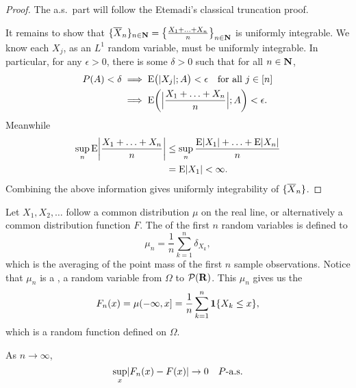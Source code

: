 \begin{proof}
    The a.s.\ part will follow the Etemadi's classical truncation proof.

    It remains to show that $\{\overline{X}_n\}_{n\in \mathbf{N}} = \bigl\{\frac{X_1 + \dotsc + X_n}{n}\bigr\}_{n\in \mathbf{N}}$ is uniformly integrable. We know each $X_j$, as an $L^1$ random variable, must be uniformly integrable. In particular, for any $\epsilon > 0$, there is some $\delta > 0$ such that for all $n\in \mathbf{N}$, \begin{align*}
    P(A) < \delta & \implies \mathop{}\!\mathrm{E} \bigl(\lvert X_j \rvert;A\bigr) < \epsilon \quad\text{for all } j \in [n] \\ & \implies \mathop{}\!\mathrm{E} \biggl(\Bigl\vert\frac{X_1 + \dotsc +X_n}{n}\Bigr\vert;A\biggr) < \epsilon.
\end{align*}
Meanwhile \begin{align*}
    \sup_n \mathop{}\!\mathrm{E} \biggl\vert\frac{X_1 + \dotsc +X_n}{n}\biggr\vert & \leq \sup_n \frac{\mathop{}\!\mathrm{E} \lvert X_1 \rvert + \dotsc + \mathop{}\!\mathrm{E}\lvert X_n \rvert}{n} \\ 
    & = \mathop{}\!\mathrm{E} \lvert X_1 \rvert < \infty.
\end{align*}
Combining the above information gives uniformly integrability of $\{\overline{X}_n\}$.
\end{proof}

\begin{namedthm}
    
\end{namedthm}

\begin{namedthm}
    
\end{namedthm}

Let $X_1,X_2,\dotsc$ follow a common distribution $\mu$ on the real line, or alternatively a common distribution function $F$. The  of the first $n$ random variables is defined to \[
    \mu_n = \frac{1}{n} \sum_{k = 1}^n \delta_{X_k},
\] which is the averaging of the point mass of the first $n$ sample observations. Notice that $\mu_n$ is a , a random variable from $\Omega$ to $\mathcal P(\mathbf{R})$. This $\mu_n$ gives us the  \[
    F_n(x) = \mu(-\infty,x] = \frac{1}{n} \sum_{k=1}^n \mathbf{1}\{X_k \leq x\},
\] which is a random function defined on $\Omega$.

\begin{namedthm}
    As $n \to \infty$, \[
        \sup_{x} \lvert F_n(x) - F(x) \rvert \to 0 \quad P\text{-a.s.}
    \]
\end{namedthm}

